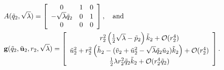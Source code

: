 \documentclass[11pt]{article}
\numberwithin{equation}{section}
\begin{document}
\begin{equation*}
\begin{split} 
    &A(\tilde{q}_2,\sqrt{\lambda}) 
    = \left[
    \begin{array}{ccc}
          0 & 1 & 0 \\
          -\sqrt{\lambda} \tilde{q}_2 & 0 &  1 \\
          0 & 0 & 0 
    \end{array}
    \right], \quad {\rm and}\\
    &{\bf g}(\tilde{q}_2,\tilde{\bf u}_2,r_2,\sqrt{\lambda}) 
    = 
    \left[
    \begin{array}{c}
        r_2^2 \left( \frac{1}{2}\sqrt{\lambda} - \tilde{p}_2 \right)\tilde{k}_2 + \mathcal{O}(r_2^4) \\
        \tilde{u}_2^2 + r_2^2 \left( \tilde{h}_2 - (\tilde{v}_2 + \tilde{u}_2^2 -\sqrt{\lambda}\tilde{q}_2 \tilde{u}_2) \tilde{k}_2 \right) + \mathcal{O}(r_2^4) \\
        \frac{1}{2} \lambda r_2^2 \tilde{q}_2 \tilde{k}_2 + \mathcal{O}(r_2^4 \tilde{q}_2)
    \end{array}
    \right].
    \end{split}
\end{equation*}
\end{document}

